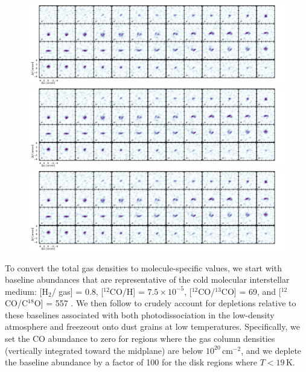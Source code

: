 \documentclass[twocolumn]{aastex61}
\begin{document}
\begin{figure}[ht!]
\begin{center}
  \includegraphics[width=\linewidth]{chanmaps_c18o.pdf}
  \includegraphics[width=\linewidth]{chanmaps_c18o.pdf}
  \includegraphics[width=\linewidth]{chanmaps_c18o.pdf}
  \end{center}
\end{figure}


To convert the total gas densities to molecule-specific values, we start with baseline abundances that are representative of the cold molecular interstellar medium: [H$_2$/ gas] = 0.8, [$^{12}$CO/H] = $7.5 \times 10^{-5}$, [$^{12}$CO/$^{13}$CO] = 69, and [$^{12}$CO/C$^{18}$O] = 557 \citep[e.g.,][]{henkel94,prantzos96}.  We then follow \citet{qi08} to crudely account for depletions relative to these baselines associated with both photodissociation in the low-density atmosphere and freezeout onto dust grains at low temperatures.  Specifically, we set the CO abundance to zero for regions where the gas column densities (vertically integrated toward the midplane) are below $10^{20}$\,cm$^{-2}$, and we deplete the baseline abundance by a factor of 100 for the disk regions where $T<19$\,K.
\end{document}

